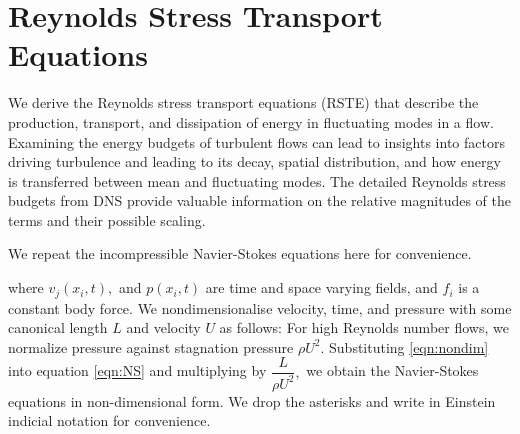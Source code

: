 \chapter{Reynolds Stress Transport Equations}
\label{chap:rste}


We derive the Reynolds stress transport equations (RSTE) that describe the production, transport, and dissipation of energy in fluctuating modes in a flow. Examining the energy budgets of turbulent flows can lead to insights into factors driving turbulence and leading to its decay, spatial distribution, and how energy is transferred between mean and fluctuating modes. The detailed Reynolds stress budgets from DNS provide valuable information on the relative magnitudes of the terms and their possible scaling.

We repeat the incompressible Navier-Stokes equations here for convenience.
\eqn{
    \rho(\ppp{t}\vect{v}+\vect{v}\cdot\grad\vect{v}) &= -\grad p + \mu \del^2\vect{v} + \rho\vect{f}
    ,\hspace{1em}&(\vect{x},t)\in\Omega\cross(0,T]\\
    \grad\cdot\vect{v} &= 0,&(\vect{x},t)\in\Omega\cross(0,T]\\
}

where $v_j(x_i,t),$ and $p(x_i,t)$ are time and space varying fields, and $f_i$ is a constant body force. We nondimensionalise velocity, time, and pressure with some canonical length $L$ and velocity $U$ as follows:
For high Reynolds number flows, we normalize pressure against stagnation pressure $\rho U^2$. Substituting \autoref{eqn:nondim} into equation \autoref{eqn:NS} and multiplying by $\dfrac{L}{\rho U^2},$ we obtain the Navier-Stokes equations in non-dimensional form.
We drop the asterisks and write in Einstein indicial notation for convenience.

